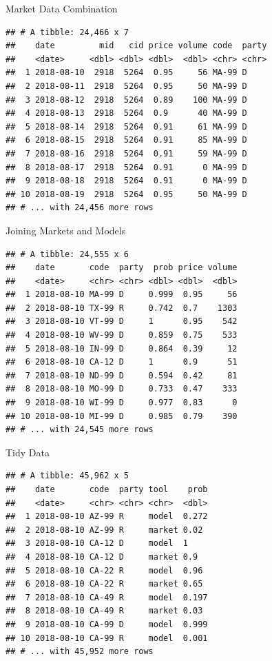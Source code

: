 \documentclass[ignorenonframetext,]{beamer}
\begin{document}
\begin{frame}[fragile]{Market Data Combination}

\begin{verbatim}
## # A tibble: 24,466 x 7
##    date         mid   cid price volume code  party
##    <date>     <dbl> <dbl> <dbl>  <dbl> <chr> <chr>
##  1 2018-08-10  2918  5264  0.95     56 MA-99 D    
##  2 2018-08-11  2918  5264  0.95     50 MA-99 D    
##  3 2018-08-12  2918  5264  0.89    100 MA-99 D    
##  4 2018-08-13  2918  5264  0.9      40 MA-99 D    
##  5 2018-08-14  2918  5264  0.91     61 MA-99 D    
##  6 2018-08-15  2918  5264  0.91     85 MA-99 D    
##  7 2018-08-16  2918  5264  0.91     59 MA-99 D    
##  8 2018-08-17  2918  5264  0.91      0 MA-99 D    
##  9 2018-08-18  2918  5264  0.91      0 MA-99 D    
## 10 2018-08-19  2918  5264  0.95     50 MA-99 D    
## # ... with 24,456 more rows
\end{verbatim}

\end{frame}

\begin{frame}[fragile]{Joining Markets and Models}

\begin{verbatim}
## # A tibble: 24,555 x 6
##    date       code  party  prob price volume
##    <date>     <chr> <chr> <dbl> <dbl>  <dbl>
##  1 2018-08-10 MA-99 D     0.999  0.95     56
##  2 2018-08-10 TX-99 R     0.742  0.7    1303
##  3 2018-08-10 VT-99 D     1      0.95    542
##  4 2018-08-10 WV-99 D     0.859  0.75    533
##  5 2018-08-10 IN-99 D     0.864  0.39     12
##  6 2018-08-10 CA-12 D     1      0.9      51
##  7 2018-08-10 ND-99 D     0.594  0.42     81
##  8 2018-08-10 MO-99 D     0.733  0.47    333
##  9 2018-08-10 WI-99 D     0.977  0.83      0
## 10 2018-08-10 MI-99 D     0.985  0.79    390
## # ... with 24,545 more rows
\end{verbatim}

\end{frame}

\begin{frame}[fragile]{Tidy Data}

\begin{verbatim}
## # A tibble: 45,962 x 5
##    date       code  party tool    prob
##    <date>     <chr> <chr> <chr>  <dbl>
##  1 2018-08-10 AZ-99 R     model  0.272
##  2 2018-08-10 AZ-99 R     market 0.02 
##  3 2018-08-10 CA-12 D     model  1    
##  4 2018-08-10 CA-12 D     market 0.9  
##  5 2018-08-10 CA-22 R     model  0.96 
##  6 2018-08-10 CA-22 R     market 0.65 
##  7 2018-08-10 CA-49 R     model  0.197
##  8 2018-08-10 CA-49 R     market 0.03 
##  9 2018-08-10 CA-99 D     model  0.999
## 10 2018-08-10 CA-99 R     model  0.001
## # ... with 45,952 more rows
\end{verbatim}

\end{frame}
\end{document}
